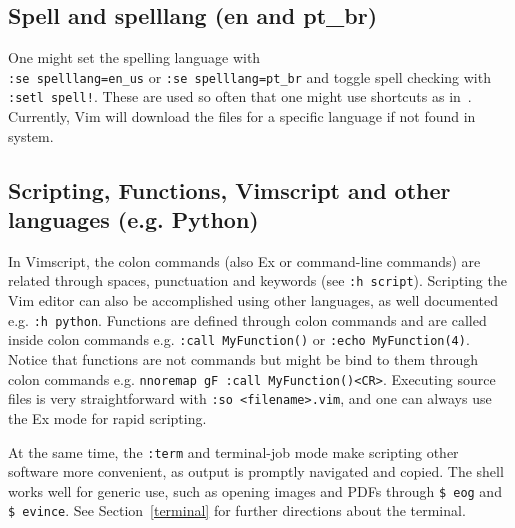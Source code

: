 \documentclass{article}
\newcommand{\tttt}[1]{\texttt{#1}}
\begin{document}
\subsection{Spell and spelllang (en and pt\_br)}
One might set the spelling language with\\ \tttt{:se spelllang=en\_us}
or \tttt{:se spelllang=pt\_br}
and toggle spell checking with \tttt{:setl spell!}.
These are used so often that one might use shortcuts as in~\cite{vimrc}.
Currently, Vim will download the files for a specific language if
not found in system.

\subsection{Scripting, Functions, Vimscript and other languages (e.g.  Python)}\label{script}
In Vimscript,
the colon commands (also Ex or command-line commands) are related through spaces,
punctuation and keywords (see \texttt{:h script}).
Scripting the Vim editor can also be accomplished using other languages,
as well documented e.g. \tttt{:h python}.
Functions are defined through colon commands and are called
inside colon commands e.g. \tttt{:call MyFunction()}
or \tttt{:echo MyFunction(4)}.
Notice that functions are not commands but might be bind to them
through colon commands e.g. \tttt{nnoremap gF :call MyFunction()<CR>}.
Executing source files is very straightforward with \tttt{:so
<filename>.vim},
and one can always use the Ex mode for rapid scripting.

At the same time, the \tttt{:term} and terminal-job mode make
scripting other software more convenient, as output is
promptly navigated and copied. The shell works well for generic use,
such as opening images and PDFs through \tttt{\$ eog} and \tttt{\$ evince}.
See Section~\ref{terminal} for further directions about the terminal.
\end{document}
